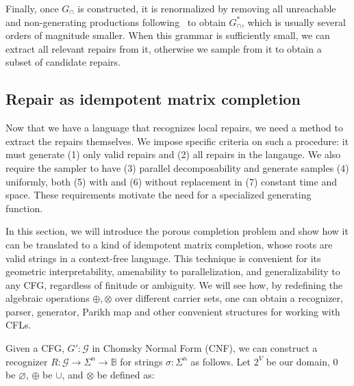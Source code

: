 \documentclass[sigplan,review,anonymous,acmsmall]{acmart}\settopmatter{printfolios=false,printccs=false,printacmref=false}
\begin{document}
  Finally, once $G_\cap$ is constructed, it is renormalized by removing all unreachable and non-generating productions following~\cite{firsov2015certified} to obtain $G_\cap^*$, which is usually several orders of magnitude smaller. When this grammar is sufficiently small, we can extract all relevant repairs from it, otherwise we sample from it to obtain a subset of candidate repairs.




  \subsection{Repair as idempotent matrix completion}

  Now that we have a language that recognizes local repairs, we need a method to extract the repairs themselves. We impose specific criteria on such a procedure: it must generate (1) only valid repairs and (2) all repairs in the langauge. We also require the sampler to have (3) parallel decomposability and generate samples (4) uniformly, both (5) with and (6) without replacement in (7) constant time and space. These requirements motivate the need for a specialized generating function.

  In this section, we will introduce the porous completion problem and show how it can be translated to a kind of idempotent matrix completion, whose roots are valid strings in a context-free language. This technique is convenient for its geometric interpretability, amenability to parallelization, and generalizability to any CFG, regardless of finitude or ambiguity. We will see how, by redefining the algebraic operations $\oplus, \otimes$ over different carrier sets, one can obtain a recognizer, parser, generator, Parikh map and other convenient structures for working with CFLs.

  Given a CFG, $G' : \mathcal{G}$ in Chomsky Normal Form (CNF), we can construct a recognizer $R: \mathcal{G} \rightarrow \Sigma^n \rightarrow \mathbb{B}$ for strings $\sigma: \Sigma^n$ as follows. Let $2^V$ be our domain, $0$ be $\varnothing$, $\oplus$ be $\cup$, and $\otimes$ be defined as:\vspace{-10pt}
\end{document}
